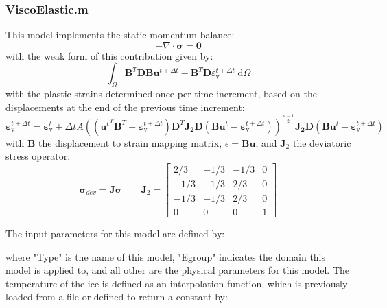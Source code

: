 \documentclass[3p]{elsarticle} %
\begin{document}
\subsubsection{ViscoElastic.m}
This model implements the static momentum balance:
\begin{equation}
-\nabla \cdot \bm{\sigma} = \bm{0} \label{eq:mom}
\end{equation}
with the weak form of this contribution given by:
\begin{equation}
\int_\Omega \bm{B}^T \bm{D} \bm{B}\bm{u}^{t+\Delta t} - \bm{B}^T \bm{D} \varepsilon_{\text{v}}^{t+\Delta t}\;\text{d}\Omega \label{eq:weak_mom}
\end{equation}
with the plastic strains determined once per time increment, based on the displacements at the end of the previous time increment:
\begin{equation}
	\mathbf{\varepsilon}_{\text{v}}^{t+\Delta t} = \mathbf{\varepsilon}_{\text{v}}^{t}+\Delta t A \left( \left({\mathbf{u}^{t}}^T\bm{B}^T-\mathbf{\varepsilon}_{\text{v}}^{t+\Delta t}\right) \bm{D}^T \bm{J_2}\bm{D} \left(\bm{B} \mathbf{u}^t-\mathbf{\varepsilon}_{\text{v}}^{t+\Delta t}\right) \right)^{\frac{n-1}{2}}\bm{J_2}\bm{D} \left(\bm{B} \mathbf{u}^t-\mathbf{\varepsilon}_{\text{v}}^{t+\Delta t}\right)
\end{equation}
with $\bm{B}$ the displacement to strain mapping matrix, $\epsilon=\bm{B}\mathbf{u}$, and $\bm{J}_2$ the deviatoric stress operator:
\begin{equation}
	\mathbf{\sigma}_{dev} = \bm{J} \mathbf{\sigma} \qquad \bm{J}_2 = \begin{bmatrix} 2/3 & -1/3 & -1/3 & 0\\ -1/3 & -1/3 & 2/3 & 0 \\ -1/3 & -1/3 & 2/3 & 0 \\ 0 & 0 & 0 & 1 \end{bmatrix} 
\end{equation}

The input parameters for this model are defined by:

where "Type" is the name of this model, "Egroup" indicates the domain this model is applied to, and all other are the physical parameters for this model. The temperature of the ice is defined as an interpolation function, which is previously loaded from a file or defined to return a constant by:

\end{document}
